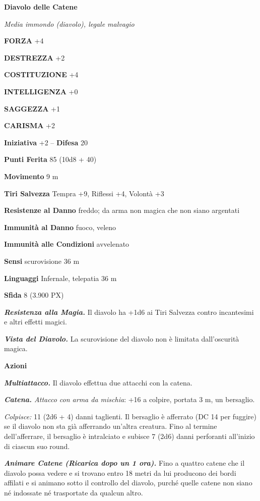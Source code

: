 \begin{multicols}{2}
	\medskip{}\textbf{Diavolo delle Catene}

	\textit{Media immondo (diavolo), legale malvagio}

	\textbf{FORZA} +4

	\textbf{DESTREZZA} +2

	\textbf{COSTITUZIONE} +4

	\textbf{INTELLIGENZA} +0

	\textbf{SAGGEZZA} +1

	\textbf{CARISMA} +2

	\textbf{Iniziativa} +2 -- \textbf{Difesa} 20

	\textbf{Punti Ferita} 85 (10d8 + 40)

	\textbf{Movimento} 9 m

	\textbf{Tiri Salvezza} Tempra +9, Riflessi +4, Volontà +3

	\textbf{Resistenze al Danno} freddo; da arma non magica che non siano argentati

	\textbf{Immunità al Danno} fuoco, veleno

	\textbf{Immunità alle Condizioni} avvelenato

	\textbf{Sensi} scurovisione 36 m

	\textbf{Linguaggi} Infernale, telepatia 36 m

	\textbf{Sfida} 8 (3.900 PX)

	\textit{\textbf{Resistenza alla Magia.}} Il diavolo ha +1d6 ai Tiri Salvezza contro incantesimi e altri effetti magici.

	\textit{\textbf{Vista del Diavolo.}} La scurovisione del diavolo non è limitata dall'oscurità magica.

	\textbf{Azioni}

	\textit{\textbf{Multiattacco.}} Il diavolo effettua due attacchi con la catena.

	\textit{\textbf{Catena.} Attacco con arma da mischia}: +16 a colpire, portata 3 m, un bersaglio.

	\textit{Colpisce:} 11 (2d6 + 4) danni taglienti. Il bersaglio è afferrato (DC 14 per fuggire) se il diavolo non sta già afferrando un'altra creatura. Fino al termine dell'afferrare, il bersaglio è intralciato e subisce 7 (2d6) danni perforanti all'inizio di ciascun suo round.

	\textit{\textbf{Animare Catene (Ricarica dopo un 1 ora).}} Fino a quattro catene che il diavolo possa vedere e si trovano entro 18 metri da lui producono dei bordi affilati e si animano sotto il controllo del diavolo, purché quelle catene non siano né indossate né trasportate da qualcun altro.


\end{multicols}

